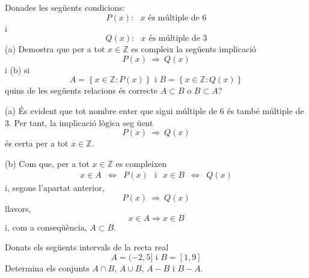 \begin{exer}
Donades les seg\"{u}ents condicions:%
\begin{equation*}
P(x):\text{ }x\text{ \'{e}s m\'{u}ltiple de }6
\end{equation*}%
i%
\begin{equation*}
Q(x):\text{ }x\text{ \'{e}s m\'{u}ltiple de }3
\end{equation*}%
(a) Demostra que per a tot $x\in \mathbb{Z}$ es compleix la seg\"{u}ents
implicaci\'{o}
\begin{equation*}
P(x)~\Longrightarrow ~Q(x)
\end{equation*}%
i (b) si%
\begin{equation*}
A=\left\{ x\in \mathbb{Z}:P(x)\right\} \text{ \ \ i \ \ }B=\left\{ x\in
\mathbb{Z}:Q(x)\right\}
\end{equation*}%
quins de les seg\"{u}ents relacions \'{e}s correcte $A\subset B$ o $B\subset
A$?
\end{exer}

\begin{solucio}
(a) \'{E}s evident que tot nombre enter que sigui m\'{u}ltiple de $6$ \'{e}s
tamb\'{e} m\'{u}ltiple de $3$. Per tant, la implicaci\'{o} l\`{o}gica seg%
\"{u}ent%
\begin{equation*}
P(x)~\Longrightarrow ~Q(x)
\end{equation*}%
\'{e}s certa per a tot $x\in \mathbb{Z}$.

(b) Com que, per a tot $x\in \mathbb{Z}$ es compleixen%
\begin{equation*}
\begin{array}{ccc}
x\in A & \Longleftrightarrow & P(x)%
\end{array}%
\text{ \ \ i \ \ }%
\begin{array}{ccc}
x\in B & \Longleftrightarrow & Q(x)%
\end{array}%
\end{equation*}%
i, segons l'apartat anterior,%
\begin{equation*}
P(x)~\Longrightarrow ~Q(x)
\end{equation*}%
llavors,%
\begin{equation*}
x\in A\Longrightarrow x\in B
\end{equation*}%
i, com a conseq\"{u}\`{e}ncia, $A\subset B$.
\end{solucio}

\begin{exer}
Donats els seg\"{u}ents intervals de la recta real%
\begin{equation*}
A=(-2,5]\text{ \ \ \ i \ \ \ }B=[1,9]
\end{equation*}%
Determina els conjunts $A\cap B$, $A\cup B$, $A-B$ i $B-A$.
\end{exer}

